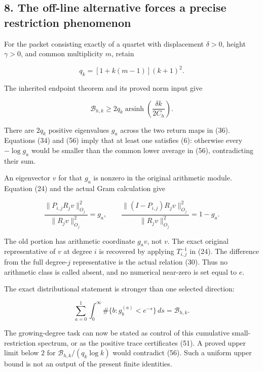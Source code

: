 \subsection{8. The off-line alternative forces a precise restriction phenomenon}\label{endpoint-restriction_original--the-off-line-alternative-forces-a-precise-restriction-phenomenon}

For the packet consisting exactly of a quartet with displacement \(\delta>0\), height \(\gamma>0\), and common multiplicity \(m\), retain

\[
 q_k=[1+k(m-1)](k+1)^2.                                           \tag{55}
\]

The inherited endpoint theorem and its proved norm input give

\[
 \mathcal B_{h,k}\ge
 2q_k\operatorname{arsinh}\!\left(\frac{\delta k}{2C_h}\right).
                                                                    \tag{56}
\]

There are \(2q_k\) positive eigenvalues \(g_a\) across the two return maps in (36). Equations (34) and (56) imply that at least one satisfies (6): otherwise every \(-\log g_a\) would be smaller than the common lower average in (56), contradicting their sum.

An eigenvector \(v\) for that \(g_a\) is nonzero in the original arithmetic module. Equation (24) and the actual Gram calculation give

\[
 \boxed{
 \frac{\|P_{i,j}R_jv\|_{O_j}^2}{\|R_jv\|_{O_j}^2}
 =g_a,\qquad
 \frac{\|(I-P_{i,j})R_jv\|_{O_j}^2}{\|R_jv\|_{O_j}^2}=1-g_a.}      \tag{57}
\]

The old portion has arithmetic coordinate \(g_av\), not \(v\). The exact original representative of \(v\) at degree \(i\) is recovered by applying \(T_{i,j}^{-1}\) in (24). The difference from the full degree-\(j\) representative is the actual relation (30). Thus no arithmetic class is called absent, and no numerical near-zero is set equal to \(e\).

The exact distributional statement is stronger than one selected direction:

\[
 \sum_{a=0}^1\int_0^\infty
   \#\{b:g_b^{(a)}<e^{-s}\}\,ds
 =\mathcal B_{h,k}.                                               \tag{58}
\]

The growing-degree task can now be stated as control of this cumulative small-restriction spectrum, or as the positive trace certificates (51). A proved upper limit below \(2\) for \(\mathcal B_{h,k}/(q_k\log k)\) would contradict (56). Such a uniform upper bound is not an output of the present finite identities.

